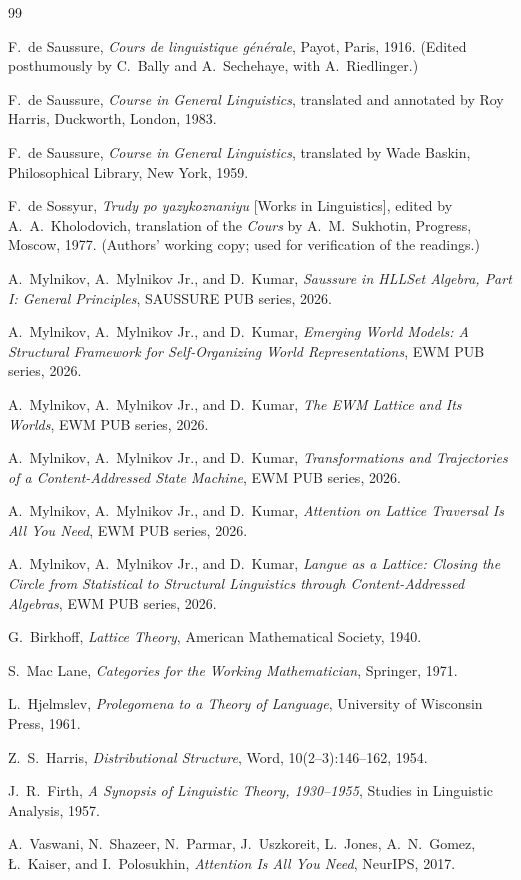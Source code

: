 \documentclass[11pt,a4paper]{article}
\theoremstyle{remark}
\begin{document}
\begin{thebibliography}{99}

 F.~de Saussure,
\textit{Cours de linguistique g\'en\'erale}, Payot, Paris, 1916.
(Edited posthumously by C.~Bally and A.~Sechehaye, with A.~Riedlinger.)

 F.~de Saussure,
\textit{Course in General Linguistics}, translated and annotated by
Roy Harris, Duckworth, London, 1983.

 F.~de Saussure,
\textit{Course in General Linguistics}, translated by Wade Baskin,
Philosophical Library, New York, 1959.

 F.~de Sossyur,
\textit{Trudy po yazykoznaniyu} [Works in Linguistics], edited by
A.~A.~Kholodovich, translation of the \textit{Cours} by A.~M.~Sukhotin,
Progress, Moscow, 1977.
(Authors' working copy; used for verification of the readings.)

 A.~Mylnikov, A.~Mylnikov Jr., and D.~Kumar,
\textit{Saussure in HLLSet Algebra, Part I: General Principles},
SAUSSURE PUB series, 2026.

 A.~Mylnikov, A.~Mylnikov Jr., and D.~Kumar,
\textit{Emerging World Models: A Structural Framework for Self-Organizing
World Representations}, EWM PUB series, 2026.

 A.~Mylnikov, A.~Mylnikov Jr., and D.~Kumar,
\textit{The EWM Lattice and Its Worlds}, EWM PUB series, 2026.

 A.~Mylnikov, A.~Mylnikov Jr., and D.~Kumar,
\textit{Transformations and Trajectories of a Content-Addressed State
Machine}, EWM PUB series, 2026.

 A.~Mylnikov, A.~Mylnikov Jr., and D.~Kumar,
\textit{Attention on Lattice Traversal Is All You Need}, EWM PUB series, 2026.

 A.~Mylnikov, A.~Mylnikov Jr., and D.~Kumar,
\textit{Langue as a Lattice: Closing the Circle from Statistical to
Structural Linguistics through Content-Addressed Algebras}, EWM PUB series,
2026.

 G.~Birkhoff,
\textit{Lattice Theory}, American Mathematical Society, 1940.

 S.~Mac Lane,
\textit{Categories for the Working Mathematician}, Springer, 1971.

 L.~Hjelmslev,
\textit{Prolegomena to a Theory of Language}, University of Wisconsin Press,
1961.

 Z.~S.~Harris,
\textit{Distributional Structure}, Word, 10(2--3):146--162, 1954.

 J.~R.~Firth,
\textit{A Synopsis of Linguistic Theory, 1930--1955}, Studies in Linguistic
Analysis, 1957.

 A.~Vaswani, N.~Shazeer, N.~Parmar, J.~Uszkoreit,
L.~Jones, A.~N.~Gomez, \L.~Kaiser, and I.~Polosukhin,
\textit{Attention Is All You Need}, NeurIPS, 2017.

\end{thebibliography}
\end{document}
